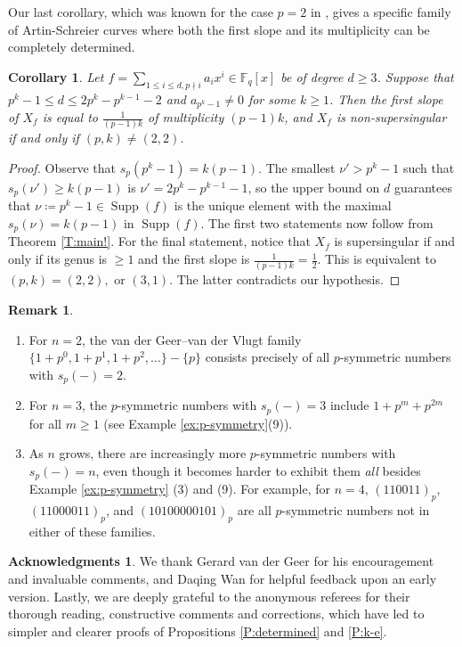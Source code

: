\documentclass{amsart}
\numberwithin{equation}{section}
\newcommand{\F}{\mathbb{F}}
\DeclareMathOperator{\Supp}{Supp}
\theoremstyle{plain}
\newtheorem{corollary}[theorem]{Corollary}
\theoremstyle{definition}
\newtheorem{remark}[theorem]{Remark}
\newtheorem{acknowledgments}{Acknowledgments}
\begin{document}
Our last corollary,
which was known for the case $p=2$ in \cite{SZ02},
gives a specific family of Artin-Schreier curves
where both the first slope and its multiplicity can be completely determined.
\begin{corollary}\label{C:ppp}
Let $f=\sum_{1\le i\le d,p\nmid i} a_ix^i\in\F_q[x]$ be of degree $d \ge 3$.
Suppose that 
    $p^k-1\le d\le 2p^k-p^{k-1}-2$ and $a_{p^k-1}\ne 0$ for some $k \ge 1$.
    Then the first slope of $X_f$ is equal to $\frac{1}{(p-1)k}$
    of multiplicity $(p-1)k$, and $X_f$ is  non-supersingular
    if and only if  $(p,k) \ne (2,2)$.
\end{corollary}

\begin{proof}
Observe that $s_p(p^k-1) = k(p-1)$.
The smallest $\nu' > p^k-1$ such that $s_p(\nu') \ge k(p-1)$
is $\nu' = 2p^k - p^{k-1}-1$, so the upper bound on $d$
guarantees that
$\nu \coloneqq p^k-1\in \Supp(f)$ is the unique element 
with the maximal $s_p(\nu)=k(p-1)$ in $\Supp(f)$.
The first two statements now follow from Theorem \ref{T:main!}.
For the final statement,
notice that $X_f$ is supersingular if and only if its genus is $\ge 1$ and 
the first slope is $\frac{1}{(p-1)k}=\frac{1}{2}$.
This is equivalent to $(p,k)=(2,2),$ 
or $(3,1)$. The latter contradicts our hypothesis.  
\end{proof}


\begin{remark}\label{R:last}
\-
\begin{enumerate}
\item
For $n=2$, the van der Geer--van der Vlugt family
$\{1+p^0,1+p^1,1+p^2,\ldots\}-\{p\}$ 
consists precisely of
all $p$-symmetric numbers with $s_p(-)=2$.
\item For $n=3$, the $p$-symmetric numbers with $s_p(-)=3$ 
include $1+p^{m}+p^{2m}$ for all $m\ge 1$ (see Example \ref{ex:p-symmetry}(9)).
\item
As $n$ grows, there are increasingly more $p$-symmetric numbers with $s_p(-)=n$, even though it becomes harder to exhibit them {\it all} besides Example \ref{ex:p-symmetry} 
(3) and (9). For example, for $n=4$, $(110011)_p$, $(11000011)_p$, and $(10100000101)_p$
are all $p$-symmetric numbers not in either of these families. 
\end{enumerate}
\end{remark}

\begin{acknowledgments}
We thank Gerard van der Geer for his encouragement and invaluable comments, and Daqing Wan for helpful feedback upon an early version.
Lastly, we are deeply grateful to the anonymous referees for their thorough 
reading, constructive comments and corrections, 
which have led to simpler and clearer proofs of Propositions \ref{P:determined}
and \ref{P:k-e}.
\end{acknowledgments}
\end{document}
